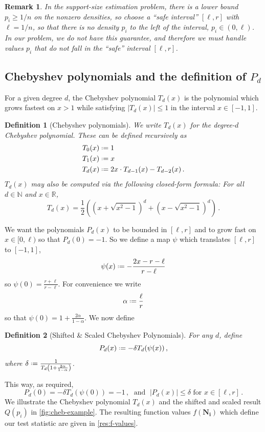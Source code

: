 \documentclass[10pt,a4paper]{article}
\newtheorem{definition}{Definition}[section]
\newtheorem{remark}{Remark}[section]
\newcommand*{\define}{\mathrel{\vcenter{\baselineskip0.5ex \lineskiplimit0pt
                      \hbox{\scriptsize.}\hbox{\scriptsize.}}}%
                      =}
\newcommand{\bN}{\ensuremath{\mathbb{N}}}
\newcommand{\bR}{\ensuremath{\mathbb{R}}}
\begin{document}
\begin{remark}
In the support-size \emph{estimation} problem, there is a lower bound $p_i \geq 1/n$ on the
nonzero densities, so \cite{WY19} choose a ``safe interval'' $[\ell, r]$ with $\ell = 1/n$,
so that there is no density $p_i$ to the left of the interval, $p_i \in (0,\ell)$.
In our problem, we do not have this guarantee, and therefore we must handle values $p_i$ that do not
fall in the ``safe'' interval $[\ell, r]$.
\end{remark}

\subsection{Chebyshev polynomials and the definition of \texorpdfstring{$P_d$}{Pd}}
\label{section:chebyshev_polynomials}

For a given degree $d$, the Chebyshev polynomial $T_d(x)$ is the polynomial which grows fastest on
$x > 1$ while satisfying $|T_d(x)| \leq 1$ in the interval $x \in [-1,1]$.

\begin{definition}[Chebyshev polynomials]
We write $T_d(x)$ for the degree-$d$ Chebyshev polynomial. These can be defined recursively as
\begin{align*}
  T_0(x) &\define 1 \\
  T_1(x) &\define x \\
  T_d(x) &\define 2x \cdot T_{d-1}(x) - T_{d-2}(x) \,.
\end{align*}
$T_d(x)$ may also be computed via the following closed-form formula:
    \label{fact:chebyshev-formula}
    For all $d \in \bN$ and $x \in \bR$, 
    \[
        T_d(x)
        = \frac{1}{2} \left( \left(x + \sqrt{x^2-1}\right)^d
            + \left(x - \sqrt{x^2-1}\right)^d \right) \,.
    \]
\end{definition}

We want the polynomials $P_d(x)$ to be bounded in $[\ell, r]$ and to 
grow fast on $x \in [0,\ell)$ so that $P_d(0) = -1$. So we define a map $\psi$ which translates
$[\ell, r]$ to $[-1,1]$,
\[
  \psi(x) \define -\frac{2x - r - \ell}{r-\ell}
\]
so $\psi(0) = \frac{r+\ell}{r-\ell}$. For convenience we write
\[
  \alpha \define \frac{\ell}{r}
\]
so that $\psi(0) = 1 + \frac{2\alpha}{1-\alpha}$. We now define

\begin{definition}[Shifted \& Scaled Chebyshev Polynomials]
For any $d$, define
\[
  P_d(x) \define - \delta T_d(\psi(x)) \,,
\]
where $\delta \define \frac{1}{T_d\left(1 + \frac{2\alpha}{1-\alpha}\right)}$.
\end{definition}
This way, as required,
\[
  P_d(0) = - \delta T_d(\psi(0)) = - 1 \,, \;\text{ and }\; |P_d(x)| \leq \delta \text{ for } x \in [\ell,
r] \,.
\]
We illustrate the Chebyshev polynomial $T_d(x)$ and the shifted and scaled result $Q(p_i)$
in \cref{fig:cheb-example}. The resulting function values $f(\bm{N_i})$ which define our test
statistic are given in \cref{res:f-values}.
\end{document}
